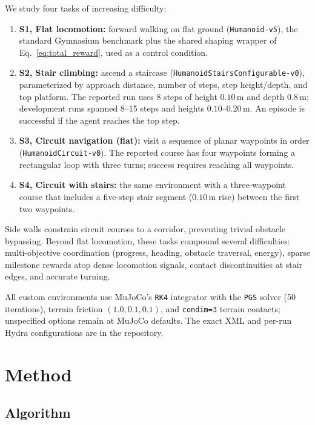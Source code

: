 \documentclass[conference,a4paper]{IEEEtran}
\begin{document}
We study four tasks of increasing difficulty:
\begin{enumerate}
    \item \textbf{S1, Flat locomotion:} forward walking on flat ground (\texttt{Humanoid-v5}), the standard Gymnasium benchmark plus the shared shaping wrapper of Eq.~\eqref{eq:total_reward}, used as a control condition.
    \item \textbf{S2, Stair climbing:} ascend a staircase (\texttt{HumanoidStairsConfigurable-v0}), parameterized by approach distance, number of steps, step height/depth, and top platform. The reported run uses 8 steps of height $0.10$\,m and depth $0.8$\,m; development runs spanned 8--15 steps and heights $0.10$--$0.20$\,m. An episode is successful if the agent reaches the top step.
    \item \textbf{S3, Circuit navigation (flat):} visit a sequence of planar waypoints in order (\texttt{HumanoidCircuit-v0}). The reported course has four waypoints forming a rectangular loop with three turns; success requires reaching all waypoints.
    \item \textbf{S4, Circuit with stairs:} the same environment with a three-waypoint course that includes a five-step stair segment ($0.10$\,m rise) between the first two waypoints.
\end{enumerate}
Side walls constrain circuit courses to a corridor, preventing trivial obstacle bypassing. Beyond flat locomotion, these tasks compound several difficulties: multi-objective coordination (progress, heading, obstacle traversal, energy), sparse milestone rewards atop dense locomotion signals, contact discontinuities at stair edges, and accurate turning.

All custom environments use MuJoCo's \texttt{RK4} integrator with the \texttt{PGS} solver (50 iterations), terrain friction $(1.0, 0.1, 0.1)$, and \texttt{condim=3} terrain contacts; unspecified options remain at MuJoCo defaults. The exact XML and per-run Hydra configurations are in the repository.

\section{Method}
\label{sec:method}

\subsection{Algorithm}
\label{sec:ppo}
\end{document}
